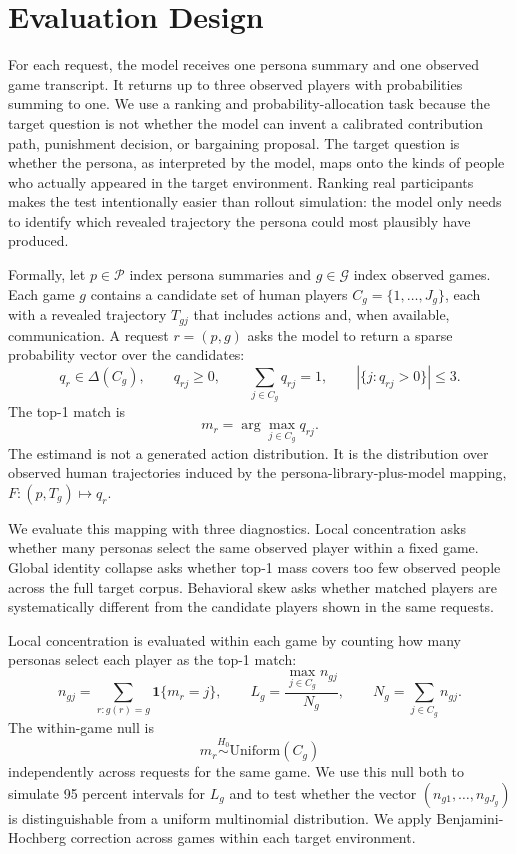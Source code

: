 \documentclass[11pt]{article}
\begin{document}
\section{Evaluation Design}

For each request, the model receives one persona summary and one observed game transcript. It returns up to three observed players with probabilities summing to one. We use a ranking and probability-allocation task because the target question is not whether the model can invent a calibrated contribution path, punishment decision, or bargaining proposal. The target question is whether the persona, as interpreted by the model, maps onto the kinds of people who actually appeared in the target environment. Ranking real participants makes the test intentionally easier than rollout simulation: the model only needs to identify which revealed trajectory the persona could most plausibly have produced.

Formally, let \(p \in \mathcal{P}\) index persona summaries and \(g \in \mathcal{G}\) index observed games. Each game \(g\) contains a candidate set of human players \(C_g=\{1,\ldots,J_g\}\), each with a revealed trajectory \(T_{gj}\) that includes actions and, when available, communication. A request \(r=(p,g)\) asks the model to return a sparse probability vector over the candidates:
\[
q_r \in \Delta(C_g), \qquad q_{rj}\ge 0,\qquad \sum_{j\in C_g} q_{rj}=1,\qquad |\{j:q_{rj}>0\}|\le 3.
\]
The top-1 match is
\[
m_r=\arg\max_{j\in C_g}q_{rj}.
\]
The estimand is not a generated action distribution. It is the distribution over observed human trajectories induced by the persona-library-plus-model mapping, \(F:(p,T_g)\mapsto q_r\).

We evaluate this mapping with three diagnostics. Local concentration asks whether many personas select the same observed player within a fixed game. Global identity collapse asks whether top-1 mass covers too few observed people across the full target corpus. Behavioral skew asks whether matched players are systematically different from the candidate players shown in the same requests.

Local concentration is evaluated within each game by counting how many personas select each player as the top-1 match:
\[
n_{gj}=\sum_{r:g(r)=g}\mathbf{1}\{m_r=j\}, \qquad
L_g=\frac{\max_{j\in C_g}n_{gj}}{N_g}, \qquad
N_g=\sum_{j\in C_g}n_{gj}.
\]
The within-game null is
\[
m_r \overset{H_0}{\sim} \mathrm{Uniform}(C_g)
\]
independently across requests for the same game. We use this null both to simulate 95 percent intervals for \(L_g\) and to test whether the vector \((n_{g1},\ldots,n_{gJ_g})\) is distinguishable from a uniform multinomial distribution. We apply Benjamini-Hochberg correction across games within each target environment.
\end{document}
